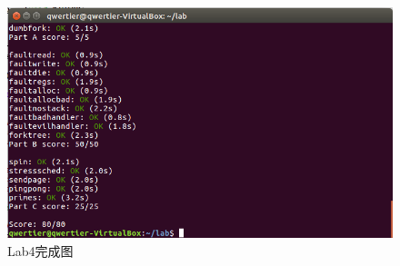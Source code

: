 \begin{ExerciseList}
\begin{figure}[H]
  \centering
  \includegraphics[width=6in]{figures/lab4/finish2.png}
  \caption{Lab4完成图}\label{fig:lab4:finish2}
\end{figure}


\end{ExerciseList}
